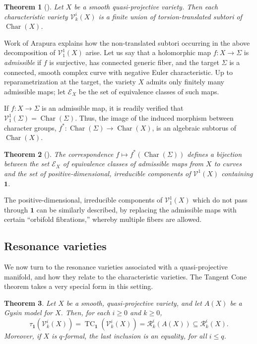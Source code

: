 \documentclass{article}
\numberwithin{equation}{section}
\newtheorem{theorem}{Theorem}[section]
\theoremstyle{definition}
\newcommand{\VV}{\mathcal{V}}
\newcommand{\RR}{\mathcal{R}}
\DeclareMathOperator{\TC}{TC}
\DeclareMathOperator{\Char}{Char}
\newcommand{\one}{\mathbf{1}}
\begin{document}
\begin{theorem}[\cite{BW-asens}]
\label{thm:bw-asens}
Let $X$ be a smooth quasi-projective variety.  Then each 
characteristic variety $\VV^i_k(X)$ is a finite union of torsion-translated 
subtori of $\Char(X)$. 
\end{theorem}

Work of Arapura \cite{Ar} explains how the  
non-translated subtori occurring in the above decomposition of 
$\VV^1_1(X)$ arise.  Let us say that a holomorphic map $f \colon X \to \Sigma$ 
is {\em admissible}\/ if $f$ is surjective, has connected generic fiber, 
and the target $\Sigma$ is a connected, smooth complex curve 
with negative Euler characteristic.  Up to reparametri\-zation at the target, 
the variety $X$ admits only finitely many admissible maps; let 
$\mathcal{E}_X$ be the set of equivalence classes of such maps. 

If $f \colon X \to \Sigma$ is an admissible map, 
it is readily verified that $\VV^1_1(\Sigma)=\Char(\Sigma)$. 
Thus, the image of the induced morphism between character groups, 
$f^*\colon \Char(\Sigma)\to \Char(X)$, is an algebraic subtorus 
of  $\Char(X)$.

\begin{theorem}[\cite{Ar}]
\label{thm:arapura}
The correspondence $f \mapsto f^*(\Char(\Sigma))$ defines 
a bijection between the set $\mathcal{E}_X$ of equivalence classes 
of admissible maps from $X$ to curves and the set of 
positive-dimensional, irreducible components of $\VV^1(X)$ 
containing $\one$.
\end{theorem}

The positive-dimensional, irreducible components of $\VV^1_1(X)$ 
which do not pass through $\one$ can be similarly described, by replacing 
the admissible maps with certain ``orbifold fibrations,'' whereby 
multiple fibers are allowed. 

\subsection{Resonance varieties}
\label{subsec:res qproj} 

We now turn to the resonance varieties associated with a 
quasi-projective manifold, and how they relate to the 
characteristic varieties.  The Tangent Cone theorem 
takes a very special form in this setting. 

\begin{theorem}
\label{thm:tcone qp}
Let $X$ be a smooth, quasi-projective variety, and let $A(X)$ be a 
Gysin model for $X$.  Then, for each $i\ge 0$ and $k\ge 0$, 
\begin{equation}
\label{eq:tcone qp}
\tau_{\one}(\VV^i_k(X)) =  \TC_{\one}(\VV^i_k(X)) = \RR^i_k(A(X)) \subseteq  \RR^i_k(X).
\end{equation}
Moreover, if $X$ is $q$-formal, the last inclusion is an equality, 
for all $i\le q$.
\end{theorem}
\end{document}
